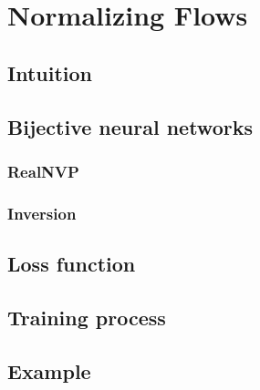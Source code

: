 \section{Normalizing Flows}
\subsection{Intuition}

\subsection{Bijective neural networks}
\subsubsection{RealNVP}

\subsubsection{Inversion}


\subsection{Loss function}

\subsection{Training process}

\subsection{Example}

